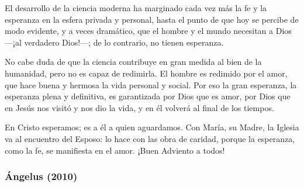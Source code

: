 \begin{body}
				El desarrollo de la ciencia moderna ha marginado cada vez más la fe y la esperanza en la esfera privada y personal, hasta el punto de que hoy se percibe de modo evidente, y a veces dramático, que el hombre y el mundo necesitan a Dios ---¡al verdadero Dios!---; de lo contrario, no tienen esperanza. 
				
				No cabe duda de que la ciencia contribuye en gran medida al bien de la humanidad, pero no es capaz de redimirla. El hombre es redimido por el amor, que hace buena y hermosa la vida personal y social. Por eso la gran esperanza, la esperanza plena y definitiva, es garantizada por Dios que es amor, por Dios que en Jesús nos visitó y nos dio la vida, y en él volverá al final de los tiempos. 
				
				En Cristo esperamos; es a él a quien aguardamos. Con María, su Madre, la Iglesia va al encuentro del Esposo: lo hace con las obra de caridad, porque la esperanza, como la fe, se manifiesta en el amor. ¡Buen Adviento a todos!
			\end{body}
	
		\subsubsection{Ángelus (2010)}
		
			
